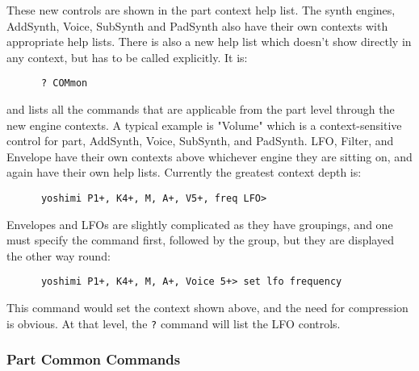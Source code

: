    These new controls are shown in the part context help list.
   The synth engines, AddSynth, Voice, SubSynth and PadSynth also have their
   own contexts with appropriate help lists.
   There is also a new help list which doesn't show directly in any context,
   but has to be called explicitly.
   It is:
   
   \begin{verbatim}
      ? COMmon
   \end{verbatim}
   
   and lists all the commands that are
   applicable from the part level through the new engine contexts.
   A typical example is "Volume" which is a context-sensitive control for part,
   AddSynth, Voice, SubSynth, and PadSynth.
   LFO, Filter, and Envelope have their own contexts above
   whichever engine they are sitting on, and again have their own help lists.
   Currently the greatest context depth is:

   \begin{verbatim}
      yoshimi P1+, K4+, M, A+, V5+, freq LFO>
   \end{verbatim}

   Envelopes and LFOs are slightly complicated as they have groupings, and one
   must specify the command first, followed by the group, but they are
   displayed the other way round:

   \begin{verbatim}
      yoshimi P1+, K4+, M, A+, Voice 5+> set lfo frequency
   \end{verbatim}

   This command would set the context shown above, and the need for
   compression is obvious.
   At that level, the \texttt{?} command will list the LFO controls.

\subsubsection{Part Common Commands}
\label{subsec:command_line_part_common_commands}

